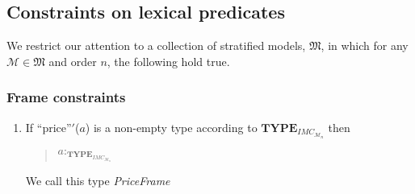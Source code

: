 \subsection{Constraints on lexical predicates}
We restrict our attention to a collection of stratified models,
$\mathfrak{M}$, in which for any $\mathscr{M}\in\mathfrak{M}$ and
order $n$, the following
hold true.

\subsubsection{Frame constraints}
\label{pg:frameconstraints}
\begin{enumerate} 
 
\item If ``price''$'$($a$) is a non-empty type according to
  $\mathbf{TYPE}_{\mathit{IMC}_{\mathscr{M}_n}}$ then
\begin{quote}
$a:_{\mathbf{TYPE}_{\mathit{IMC}_{\mathscr{M}_n}}}$

\end{quote}

We call this type \textit{PriceFrame}
 

\end{enumerate}
